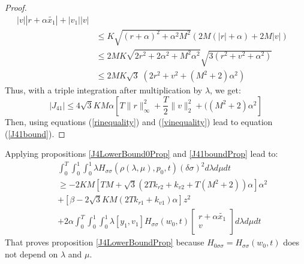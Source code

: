 \documentclass[a4paper,10pt]{article}
\begin{document}
\begin{proof}
\begin{align*}
	|v||r+\alpha\tilde{x_{1}}|+|v_{1}||v|&
           \\
            & \leq   K \sqrt{(r+\alpha)^{2} + 
	    \alpha^{2}M^{2}}(2M(|r|+\alpha) + 2M|v|)
          \\
            & \leq  2MK \sqrt{2r^{2}+2\alpha^{2} + 
	    M^{2}\alpha^{2}}\sqrt{3(r^{2}+v^{2}+\alpha^{2})}&
           \\
            & \leq  2MK \sqrt{3} \; (2r^{2}+v^{2}+(M^{2}+2)\alpha^{2})
        \end{align*}
	Thus, with a triple integration after multiplication by 
	$\lambda$, we get:
	\[
	    |J_{41}| \leq 4 
            \sqrt{3}KM\alpha\left[T\|r\|_{\infty}^{2} + 
	    \frac{T}{2}\|v\|_{2}^{2}+((M^{2}+2)\alpha^{2}\right] 
	\]
	Then, using equations (\ref{rinequality}) and  
	(\ref{vinequality}) lead to equation  (\ref{J41bound}).
\end{proof}
Applying propositions \ref{J4LowerBound0Prop} and \ref{J41boundProp} 
lead to:
    \begin{eqnarray*}
        &&\int_{0}^{T} \int_{0}^{1} \int_{0}^{1} \lambda H_{\sigma 
	\sigma}(\rho(\lambda,\mu),p_{0},t)(\delta \sigma)^{2}  
	d \lambda d \mu dt \\ && \geq  
	-2KM \left[TM+\sqrt{3}(2Tk_{r2}+k_{v2}+T(M^{2}+2))\alpha\right] \alpha^{2}
        \\
         &  & + \left[\beta - 2\sqrt{3}KM(2Tk_{r1}+k_{v1})\alpha\right] z^{2}
        \\
	&&+ 2 \alpha \int_{0}^{T} \int_{0}^{1} \int_{0}^{1} \lambda \left[y_{1},v_{1}\right]
	H_{\sigma \sigma}(w_{0},t)
	\left[
	\begin{array}
	{c}
	    r+\alpha\tilde{x_{1}}  \\
	    v  \\
	\end{array}
	\right] d \lambda d \mu dt
    \end{eqnarray*}
That proves proposition \ref{J4LowerBoundProp} because
$H_{0 \sigma \sigma}=H_{\sigma \sigma}(w_{0},t)$
does not depend on $\lambda$ and $\mu$.
\end{document}
